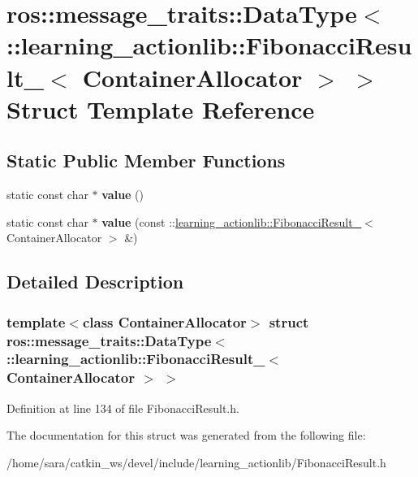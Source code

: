 \hypertarget{structros_1_1message__traits_1_1DataType_3_01_1_1learning__actionlib_1_1FibonacciResult___3_01ContainerAllocator_01_4_01_4}{}\section{ros\+:\+:message\+\_\+traits\+:\+:Data\+Type$<$ \+:\+:learning\+\_\+actionlib\+:\+:Fibonacci\+Result\+\_\+$<$ Container\+Allocator $>$ $>$ Struct Template Reference}
\label{structros_1_1message__traits_1_1DataType_3_01_1_1learning__actionlib_1_1FibonacciResult___3_01ContainerAllocator_01_4_01_4}
\subsection*{Static Public Member Functions}
\begin{DoxyCompactItemize}
\item 
\mbox{\label{structros_1_1message__traits_1_1DataType_3_01_1_1learning__actionlib_1_1FibonacciResult___3_01ContainerAllocator_01_4_01_4_a3937d82d5c81a424a7cf2713992f1dcb}} 
static const char $\ast$ {\bfseries value} ()
\item 
\mbox{\label{structros_1_1message__traits_1_1DataType_3_01_1_1learning__actionlib_1_1FibonacciResult___3_01ContainerAllocator_01_4_01_4_a1b0fb2b8a0a574887a0dec2079b8e51f}} 
static const char $\ast$ {\bfseries value} (const \+::\hyperlink{structlearning__actionlib_1_1FibonacciResult__}{learning\+\_\+actionlib\+::\+Fibonacci\+Result\+\_\+}$<$ Container\+Allocator $>$ \&)
\end{DoxyCompactItemize}


\subsection{Detailed Description}
\subsubsection*{template$<$class Container\+Allocator$>$\newline
struct ros\+::message\+\_\+traits\+::\+Data\+Type$<$ \+::learning\+\_\+actionlib\+::\+Fibonacci\+Result\+\_\+$<$ Container\+Allocator $>$ $>$}



Definition at line 134 of file Fibonacci\+Result.\+h.



The documentation for this struct was generated from the following file\+:\begin{DoxyCompactItemize}
\item 
/home/sara/catkin\+\_\+ws/devel/include/learning\+\_\+actionlib/Fibonacci\+Result.\+h\end{DoxyCompactItemize}
